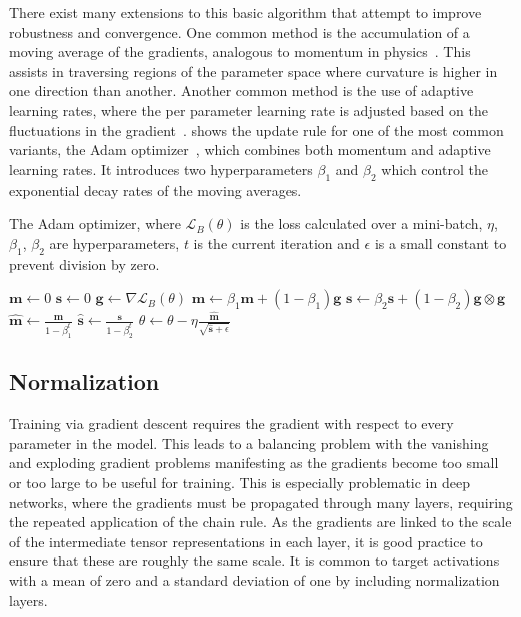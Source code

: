 There exist many extensions to this basic algorithm that attempt to improve robustness and convergence.
One common method is the accumulation of a moving average of the gradients, analogous to momentum in physics~\cite{Momentum}.
This assists in traversing regions of the parameter space where curvature is higher in one direction than another.
Another common method is the use of adaptive learning rates, where the per parameter learning rate is adjusted based on the fluctuations in the gradient~\cite{Adagrad, RMSProp}.
 shows the update rule for one of the most common variants, the Adam optimizer~\cite{Adam}, which combines both momentum and adaptive learning rates.
It introduces two hyperparameters $\beta_1$ and $\beta_2$ which control the exponential decay rates of the moving averages.

\begin{algorithm}
\caption{The Adam optimizer, where $\mathcal{L}_B(\theta)$ is the loss calculated over a mini-batch, $\eta$, $\beta_1$, $\beta_2$ are hyperparameters, $t$ is the current iteration and $\epsilon$ is a small constant to prevent division by zero.}
\label{alg:adam}
\begin{algorithmic}[1]
\State $\mathbf{m} \gets 0$ 
\State $\mathbf{s} \gets 0$ 
    \State $\mathbf{g} \gets \nabla \mathcal{L}_B(\theta)$ 
    \State $\mathbf{m} \gets \beta_1 \mathbf{m} + (1 - \beta_1) \mathbf{g}$ 
    \State $\mathbf{s} \gets \beta_2 \mathbf{s} + (1 - \beta_2) \mathbf{g} \otimes \mathbf{g}$ 
    \State $\hat{\mathbf{m}} \gets \frac{\mathbf{m}}{1 - \beta_1^t}$ 
    \State $\hat{\mathbf{s}} \gets \frac{\mathbf{s}}{1 - \beta_2^t}$ 
    \State $\theta \gets \theta - \eta \frac{\hat{\mathbf{m}}}{\sqrt{\hat{\mathbf{s}} + \epsilon}}$ 
\EndFor
\end{algorithmic}
\end{algorithm}

\subsection{Normalization}

Training via gradient descent requires the gradient with respect to every parameter in the model.
This leads to a balancing problem with the vanishing and exploding gradient problems manifesting as the gradients become too small or too large to be useful for training.
This is especially problematic in deep networks, where the gradients must be propagated through many layers, requiring the repeated application of the chain rule.
As the gradients are linked to the scale of the intermediate tensor representations in each layer, it is good practice to ensure that these are roughly the same scale.
It is common to target activations with a mean of zero and a standard deviation of one by including normalization layers.

